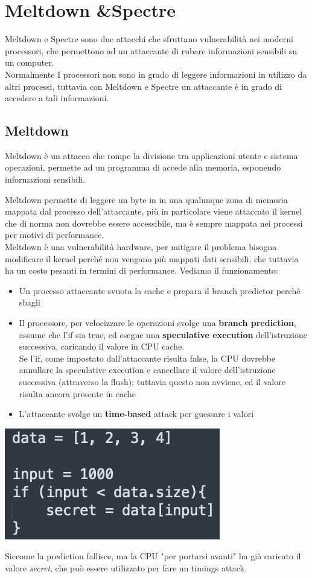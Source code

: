 \documentclass[11pt, oneside]{article}   	%
\begin{document}
\section*{Meltdown \&Spectre}
Meltdown e Spectre sono due attacchi che sfruttano vulnerabilità nei moderni processori, che permettono ad un attaccante di rubare informazioni sensibili su un computer.\\
Normalmente I processori non sono in grado di leggere informazioni in utilizzo da altri processi, tuttavia con Meltdown e Spectre un attaccante è in grado di accedere a tali informazioni.

\subsection*{Meltdown}
Meltdown è un attacco che rompe la divisione tra applicazioni utente e sistema operazioni, permette ad un programma di accede alla memoria, esponendo informazioni sensibili. 

Meltdown permette di leggere un byte in in una qualunque zona di memoria mappata dal processo dell'attaccante, più in particolare viene attaccato il kernel che di norma non dovrebbe essere accessibile, ma è sempre mappata nei processi per motivi di performance.\\
Meltdown è una vulnerabilità hardware, per mitigare il problema bisogna modificare il kernel perché non vengano più mappati dati sensibili, che tuttavia ha un costo pesanti in termini di performance.
Vediamo il funzionamento:
\begin{itemize}
\item Un processo attaccante svuota la cache e prepara il branch predictor perché sbagli
\item Il processore, per velocizzare le operazioni svolge una \textbf{branch prediction}, assume che l'if sia true, ed esegue una \textbf{speculative execution} dell'istruzione successiva, caricando il valore in CPU cache.\\
Se l'if, come impostato dall'attaccante risulta false, la CPU dovrebbe annullare la speculative execution e cancellare il valore dell'istruzione successiva (attraverso la flush); tuttavia questo non avviene, ed il valore risulta ancora presente in cache
\item L'attaccante svolge un \textbf{time-based} attack per guessare i valori
\end{itemize}
\begin{center}
\includegraphics[scale = 0.8]{meltdown}
\end{center}
Siccome la prediction fallisce, ma la CPU "per portarsi avanti" ha già caricato il valore \emph{secret}, che può essere utilizzato per fare un timings attack.
\end{document}
